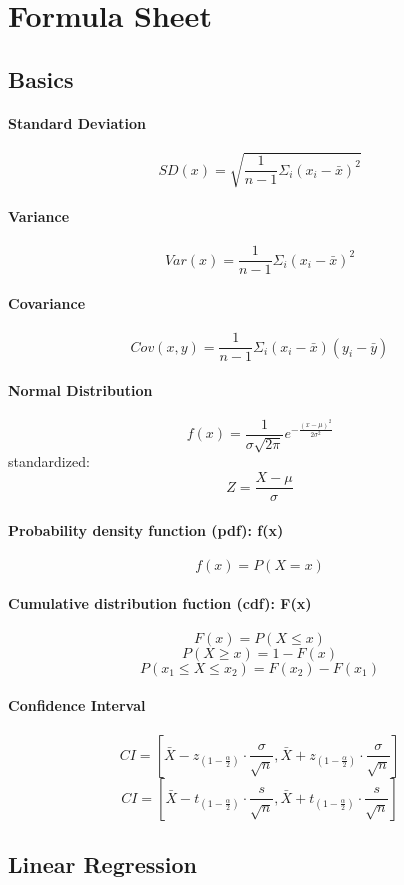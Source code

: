 \section{Formula Sheet}
\subsection{Basics}
\paragraph{Standard Deviation} $$SD(x) = \sqrt{\frac{1}{n-1}\Sigma_i (x_i - \bar{x})^2}$$
\paragraph{Variance} $$Var(x) = \frac{1}{n-1}\Sigma_i (x_i - \bar{x})^2$$
\paragraph{Covariance} $$Cov(x,y) = \frac{1}{n-1}\Sigma_i (x_i - \bar{x})(y_i - \bar{y})$$
\paragraph{Normal Distribution} $$f(x) = \frac{1}{\sigma \sqrt{2\pi}}e^{-\frac{(x-\mu)^2}{2\sigma^2}}$$
standardized: $$Z = \frac{X - \mu}{\sigma}$$
\paragraph{Probability density function (pdf): f(x)} $$f(x) = P(X = x)$$

\paragraph{Cumulative distribution fuction (cdf): F(x)} $$F(x) = P(X \leq x)$$ $$P(X \geq x) = 1 - F(x)$$  $$P(x_1 \leq X \leq x_2) = F(x_2) - F(x_1)$$
\paragraph{Confidence Interval} $$CI = \left[ \bar{X} - z_{(1 - \frac{\alpha}{2})}\cdot \frac{\sigma}{\sqrt{n}} , \bar{X} + z_{(1 - \frac{\alpha}{2})}\cdot \frac{\sigma}{\sqrt{n}} \right] $$
$$CI = \left[ \bar{X} - t_{(1 - \frac{\alpha}{2})}\cdot \frac{s}{\sqrt{n}} , \bar{X} + t_{(1 - \frac{\alpha}{2})}\cdot \frac{s}{\sqrt{n}} \right] $$
\subsection{Linear Regression}
